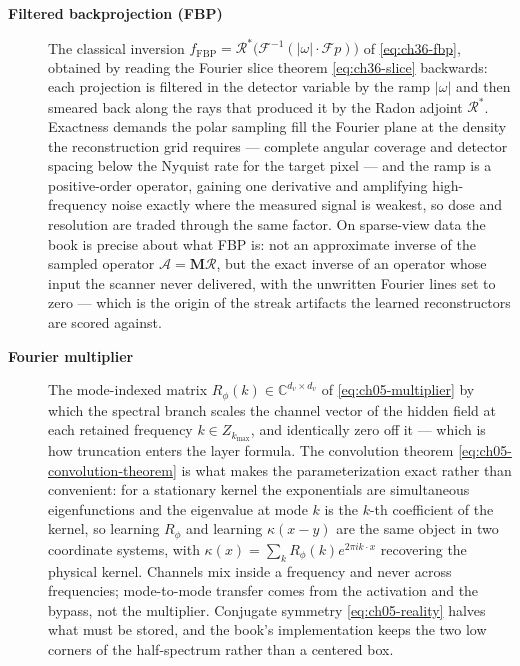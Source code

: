 \begin{description}
\item[\textbf{Filtered backprojection (FBP)}] The classical inversion
$f_{\text{FBP}} = \mathcal{R}^{*}\big(\mathcal{F}^{-1}(|\omega|\cdot \mathcal{F}p)\big)$
of \eqref{eq:ch36-fbp}, obtained by reading the Fourier slice theorem
\eqref{eq:ch36-slice} backwards: each projection is filtered in the detector variable
by the ramp $|\omega|$ and then smeared back along the rays that produced it by the
Radon adjoint $\mathcal{R}^{*}$. Exactness demands the polar sampling fill the Fourier
plane at the density the reconstruction grid requires --- complete angular coverage
and detector spacing below the Nyquist rate for the target pixel --- and the ramp is
a positive-order operator, gaining one derivative and amplifying high-frequency noise
exactly where the measured signal is weakest, so dose and resolution are traded
through the same factor. On sparse-view data the book is precise about what FBP is:
not an approximate inverse of the sampled operator $\mathcal{A} = \mathbf{M}
\mathcal{R}$, but the exact inverse of an operator whose input the scanner never
delivered, with the unwritten Fourier lines set to zero --- which is the origin of the
streak artifacts the learned reconstructors are scored against.

\item[\textbf{Fourier multiplier}] The mode-indexed matrix
$R_{\phi}(k) \in \mathbb{C}^{d_{v} \times d_{v}}$ of \eqref{eq:ch05-multiplier} by
which the spectral branch scales the channel vector of the hidden field at each
retained frequency $k \in Z_{k_{\max}}$, and identically zero off it --- which is how
truncation enters the layer formula. The convolution theorem
\eqref{eq:ch05-convolution-theorem} is what makes the parameterization exact rather
than convenient: for a stationary kernel the exponentials are simultaneous
eigenfunctions and the eigenvalue at mode $k$ is the $k$-th coefficient of the
kernel, so learning $R_{\phi}$ and learning $\kappa(x-y)$ are the same object in two
coordinate systems, with $\kappa(x) = \sum_{k} R_{\phi}(k) e^{2\pi i k \cdot x}$
recovering the physical kernel. Channels mix inside a frequency and never across
frequencies; mode-to-mode transfer comes from the activation and the bypass, not the
multiplier. Conjugate symmetry \eqref{eq:ch05-reality} halves what must be stored,
and the book's implementation keeps the two low corners of the half-spectrum rather
than a centered box. 


\end{description}
